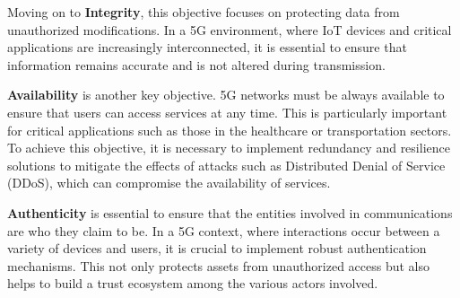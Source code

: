 \documentclass[english]{article}
\begin{document}
Moving on to \textbf{Integrity}, this objective focuses on protecting data from
unauthorized modifications. In a 5G environment, where IoT devices and critical
applications are increasingly interconnected, it is essential to ensure that
information remains accurate and is not altered during transmission.

\textbf{Availability} is another key objective. 5G networks must be always
available to ensure that users can access services at any time. This is
particularly important for critical applications such as those in the healthcare
or transportation sectors. To achieve this objective, it is necessary to implement
redundancy and resilience solutions to mitigate the effects of attacks such as
Distributed Denial of Service (DDoS), which can compromise the availability of services.

\textbf{Authenticity} is essential to ensure that the entities involved in
communications are who they claim to be. In a 5G context, where interactions
occur between a variety of devices and users, it is crucial to implement robust
authentication mechanisms. This not only protects assets from unauthorized
access but also helps to build a trust ecosystem among the various actors involved.
\end{document}
